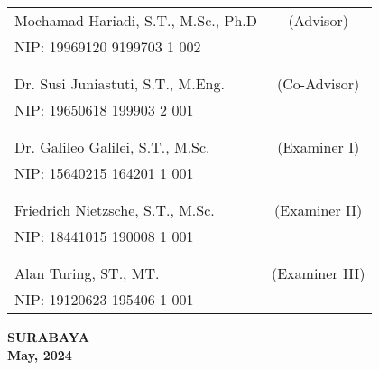     \noindent
    \begin{tabularx}{\textwidth}{X c}
      Mochamad Hariadi, S.T., M.Sc., Ph.D          & (Advisor) \\
      NIP: 19969120 9199703 1 002        & \\
      &  \\
      &  \\
      Dr. Susi Juniastuti, S.T., M.Eng.     & (Co-Advisor) \\
      NIP: 19650618 199903 2 001        & \\
      &  \\
      &  \\
      Dr. Galileo Galilei, S.T., M.Sc.  & (Examiner I) \\
      NIP: 15640215 164201 1 001        & \\
      &  \\
      &  \\
      Friedrich Nietzsche, S.T., M.Sc.  & (Examiner II) \\
      NIP: 18441015 190008 1 001        & \\
      &  \\
      &  \\
      Alan Turing, ST., MT.             & (Examiner III) \\
      NIP: 19120623 195406 1 001        & \\
    \end{tabularx}
  \endgroup

  \vspace{4ex}

  \begin{center}
    \textbf{SURABAYA} \\
    \textbf{May, 2024}
  \end{center}
\endgroup

